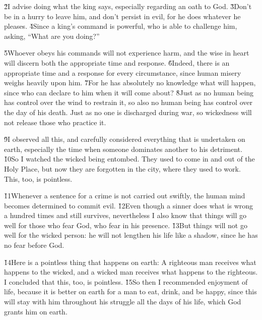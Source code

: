 \v{2}I advise doing what the king says, especially regarding an oath to God. \v{3}Don't be in a hurry to leave him, and don't persist in evil, for he does whatever he pleases. \v{4}Since a king's command is powerful, who is able to challenge him, asking, ``What are you doing?''

\v{5}Whoever obeys his commands will not experience harm, and the wise in heart will discern both the appropriate time and response. \v{6}Indeed, there is an appropriate time and a response for every circumstance, since human misery weighs heavily upon him. \v{7}For he has absolutely no knowledge what will happen, since who can declare to him when it will come about? \v{8}Just as no human being has control over the wind to restrain it, so also no human being has control over the day of his death. Just as no one is discharged during war, so wickedness will not release those who practice it.

\v{9}I observed all this, and carefully considered everything that is undertaken on earth, especially the time when someone dominates another to his detriment. \v{10}So I watched the wicked being entombed. They used to come in and out of the Holy Place, but now they are forgotten in the city, where they used to work. This, too, is pointless.

\v{11}Whenever a sentence for a crime is not carried out swiftly, the human mind becomes determined to commit evil. \v{12}Even though a sinner does what is wrong a hundred times and still survives, nevertheless I also know that things will go well for those who fear God, who fear in his presence. \v{13}But things will not go well for the wicked person: he will not lengthen his life like a shadow, since he has no fear before God.

\v{14}Here is a pointless thing that happens on earth: A righteous man receives what happens to the wicked, and a wicked man receives what happens to the righteous. I concluded that this, too, is pointless. \v{15}So then I recommended enjoyment of life, because it is better on earth for a man to eat, drink, and be happy, since this will stay with him throughout his struggle all the days of his life, which God grants him on earth.

